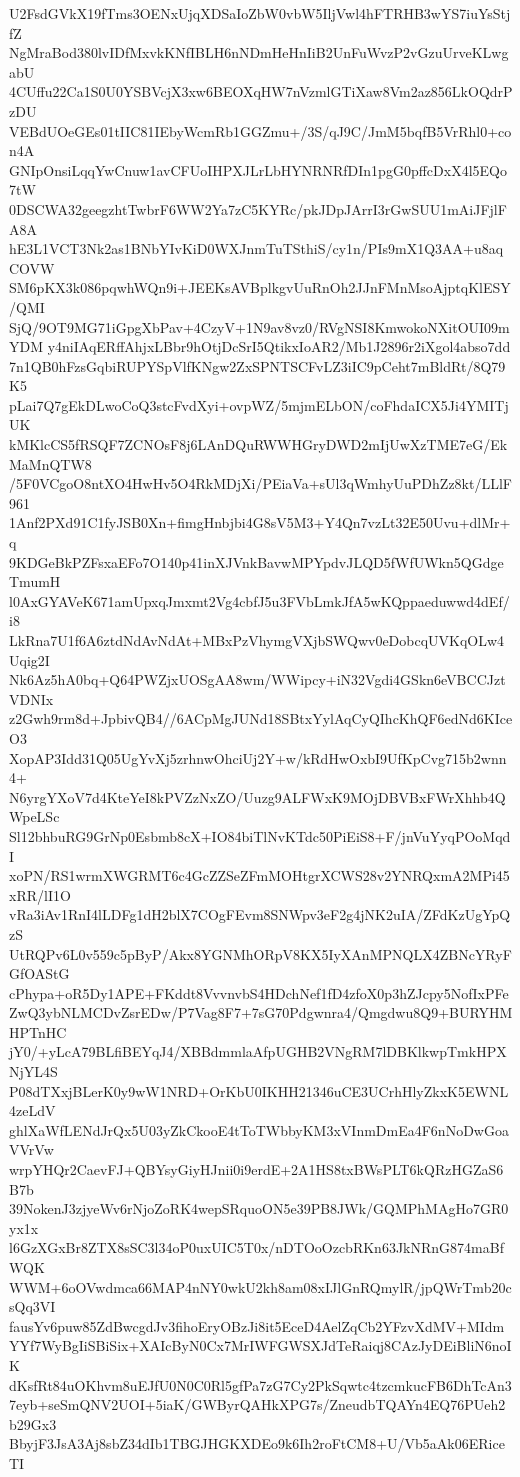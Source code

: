U2FsdGVkX19fTms3OENxUjqXDSaIoZbW0vbW5IljVwl4hFTRHB3wYS7iuYsStjfZ
NgMraBod380lvIDfMxvkKNfIBLH6nNDmHeHnIiB2UnFuWvzP2vGzuUrveKLwgabU
4CUffu22Ca1S0U0YSBVcjX3xw6BEOXqHW7nVzmlGTiXaw8Vm2az856LkOQdrPzDU
VEBdUOeGEs01tIIC81IEbyWcmRb1GGZmu+/3S/qJ9C/JmM5bqfB5VrRhl0+con4A
GNIpOnsiLqqYwCnuw1avCFUoIHPXJLrLbHYNRNRfDIn1pgG0pffcDxX4l5EQo7tW
0DSCWA32geegzhtTwbrF6WW2Ya7zC5KYRc/pkJDpJArrI3rGwSUU1mAiJFjlFA8A
hE3L1VCT3Nk2as1BNbYIvKiD0WXJnmTuTSthiS/cy1n/PIs9mX1Q3AA+u8aqCOVW
SM6pKX3k086pqwhWQn9i+JEEKsAVBplkgvUuRnOh2JJnFMnMsoAjptqKlESY/QMI
SjQ/9OT9MG71iGpgXbPav+4CzyV+1N9av8vz0/RVgNSI8KmwokoNXitOUI09mYDM
y4niIAqERffAhjxLBbr9hOtjDcSrI5QtikxIoAR2/Mb1J2896r2iXgol4abso7dd
7n1QB0hFzsGqbiRUPYSpVlfKNgw2ZxSPNTSCFvLZ3iIC9pCeht7mBldRt/8Q79K5
pLai7Q7gEkDLwoCoQ3stcFvdXyi+ovpWZ/5mjmELbON/coFhdaICX5Ji4YMITjUK
kMKlcCS5fRSQF7ZCNOsF8j6LAnDQuRWWHGryDWD2mIjUwXzTME7eG/EkMaMnQTW8
/5F0VCgoO8ntXO4HwHv5O4RkMDjXi/PEiaVa+sUl3qWmhyUuPDhZz8kt/LLlF961
1Anf2PXd91C1fyJSB0Xn+fimgHnbjbi4G8sV5M3+Y4Qn7vzLt32E50Uvu+dlMr+q
9KDGeBkPZFsxaEFo7O140p41inXJVnkBavwMPYpdvJLQD5fWfUWkn5QGdgeTmumH
l0AxGYAVeK671amUpxqJmxmt2Vg4cbfJ5u3FVbLmkJfA5wKQppaeduwwd4dEf/i8
LkRna7U1f6A6ztdNdAvNdAt+MBxPzVhymgVXjbSWQwv0eDobcqUVKqOLw4Uqig2I
Nk6Az5hA0bq+Q64PWZjxUOSgAA8wm/WWipcy+iN32Vgdi4GSkn6eVBCCJztVDNIx
z2Gwh9rm8d+JpbivQB4//6ACpMgJUNd18SBtxYylAqCyQIhcKhQF6edNd6KIceO3
XopAP3Idd31Q05UgYvXj5zrhnwOhciUj2Y+w/kRdHwOxbI9UfKpCvg715b2wnn4+
N6yrgYXoV7d4KteYeI8kPVZzNxZO/Uuzg9ALFWxK9MOjDBVBxFWrXhhb4QWpeLSc
Sl12bhbuRG9GrNp0Esbmb8cX+IO84biTlNvKTdc50PiEiS8+F/jnVuYyqPOoMqdI
xoPN/RS1wrmXWGRMT6c4GcZZSeZFmMOHtgrXCWS28v2YNRQxmA2MPi45xRR/lI1O
vRa3iAv1RnI4lLDFg1dH2blX7COgFEvm8SNWpv3eF2g4jNK2uIA/ZFdKzUgYpQzS
UtRQPv6L0v559c5pByP/Akx8YGNMhORpV8KX5IyXAnMPNQLX4ZBNcYRyFGfOAStG
cPhypa+oR5Dy1APE+FKddt8VvvnvbS4HDchNef1fD4zfoX0p3hZJcpy5NofIxPFe
ZwQ3ybNLMCDvZsrEDw/P7Vag8F7+7sG70Pdgwnra4/Qmgdwu8Q9+BURYHMHPTnHC
jY0/+yLcA79BLfiBEYqJ4/XBBdmmlaAfpUGHB2VNgRM7lDBKlkwpTmkHPXNjYL4S
P08dTXxjBLerK0y9wW1NRD+OrKbU0IKHH21346uCE3UCrhHlyZkxK5EWNL4zeLdV
ghlXaWfLENdJrQx5U03yZkCkooE4tToTWbbyKM3xVInmDmEa4F6nNoDwGoaVVrVw
wrpYHQr2CaevFJ+QBYsyGiyHJnii0i9erdE+2A1HS8txBWsPLT6kQRzHGZaS6B7b
39NokenJ3zjyeWv6rNjoZoRK4wepSRquoON5e39PB8JWk/GQMPhMAgHo7GR0yx1x
l6GzXGxBr8ZTX8sSC3l34oP0uxUIC5T0x/nDTOoOzcbRKn63JkNRnG874maBfWQK
WWM+6oOVwdmca66MAP4nNY0wkU2kh8am08xIJlGnRQmylR/jpQWrTmb20csQq3VI
fausYv6puw85ZdBwcgdJv3fihoEryOBzJi8it5EceD4AelZqCb2YFzvXdMV+MIdm
YYf7WyBgIiSBiSix+XAIcByN0Cx7MrIWFGWSXJdTeRaiqj8CAzJyDEiBliN6noIK
dKsfRt84uOKhvm8uEJfU0N0C0Rl5gfPa7zG7Cy2PkSqwtc4tzcmkucFB6DhTcAn3
7eyb+seSmQNV2UOI+5iaK/GWByrQAHkXPG7s/ZneudbTQAYn4EQ76PUeh2b29Gx3
BbyjF3JsA3Aj8sbZ34dIb1TBGJHGKXDEo9k6Ih2roFtCM8+U/Vb5aAk06ERiceTI
